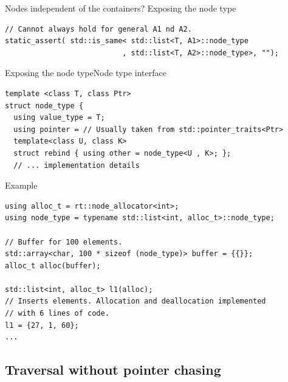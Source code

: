 \documentclass[10pt,aspectratio=169]{beamer}
\begin{document}
\begin{frame}[fragile]
{Nodes independent of the containers?}
{Exposing the node type}

\begin{lstlisting}
// Cannot always hold for general A1 nd A2.
static_assert( std::is_same< std::list<T, A1>::node_type
                           , std::list<T, A2>::node_type>, "");
\end{lstlisting}

\end{frame}

\begin{frame}[fragile]{Exposing the node type}{Node type interface}

\begin{lstlisting}
template <class T, class Ptr>
struct node_type {
  using value_type = T;
  using pointer = // Usually taken from std::pointer_traits<Ptr>
  template<class U, class K>
  struct rebind { using other = node_type<U , K>; };
  // ... implementation details
\end{lstlisting}

\end{frame}

\begin{frame}[fragile]{Example}

\begin{lstlisting}
using alloc_t = rt::node_allocator<int>;
using node_type = typename std::list<int, alloc_t>::node_type;

// Buffer for 100 elements.
std::array<char, 100 * sizeof (node_type)> buffer = {{}};
alloc_t alloc(buffer);

std::list<int, alloc_t> l1(alloc);
// Inserts elements. Allocation and deallocation implemented
// with 6 lines of code.
l1 = {27, 1, 60};
...
\end{lstlisting}

\end{frame}

\subsection{Traversal without pointer chasing}
\end{document}

